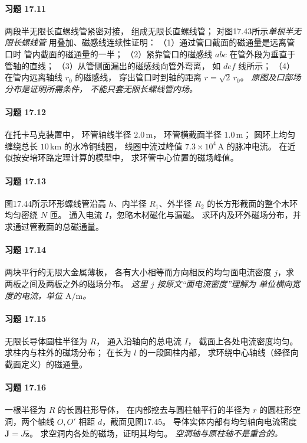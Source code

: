 \paragraph{习题 17.11}
两段半无限长直螺线管紧密对接，
组成无限长直螺线管；
对图17.43所示\emph{单根半无限长螺线管}
用叠加、磁感线连续性证明：
（1）通过管口截面的磁通量是远离管口时
管内截面的磁通量的一半；
（2）紧靠管口的磁感线
\(abc\) 在管外段为垂直于管轴的直线；
（3）从管侧面漏出的磁感线向管外弯离，
如 \(def\) 线所示；
（4）在管内远离轴线 \(r_0\) 的磁感线，
穿出管口时到轴的距离
\(r=\sqrt2\,r_0\)。
\textit{原图及口部场分布是证明所需条件，
不能只套无限长螺线管内场。}

\paragraph{习题 17.12}
在托卡马克装置中，
环管轴线半径
\(2.0\,\mathrm m\)，
环管横截面半径
\(1.0\,\mathrm m\)；
圆环上均匀缠绕总长
\(10\,\mathrm{km}\) 的水冷铜线圈，
线圈中流过峰值
\(7.3\times10^4\,\mathrm A\)
的脉冲电流。
在近似按安培环路定理计算的模型中，
求环管中心位置的磁场峰值。

\paragraph{习题 17.13}
图17.44所示环形螺线管沿高
\(h\)、内半径 \(R_1\)、外半径
\(R_2\) 的长方形截面的整个木环
均匀密绕 \(N\) 匝。
通入电流 \(I\)，忽略木材磁化与漏磁。
求环内及环外磁场分布，并求通过管截面的总磁通量。

\paragraph{习题 17.14}
两块平行的无限大金属薄板，
各有大小相等而方向相反的均匀面电流密度
\(j\)，求两板之间及两板之外的磁场分布。
\textit{这里 \(j\) 按原文“面电流密度”理解为
单位横向宽度的电流，单位 \(\mathrm{A/m}\)。}

\paragraph{习题 17.15}
无限长导体圆柱半径为 \(R\)，
通入沿轴向的总电流 \(I\)，
截面上各处电流密度均匀。
求柱内与柱外的磁场分布；
在长为 \(l\) 的一段圆柱内部，
求环绕中心轴线（经径向截面定义）的磁通量。

\paragraph{习题 17.16}
一根半径为 \(R\) 的长圆柱形导体，
在内部挖去与圆柱轴平行的半径为 \(r\)
的圆柱形空洞，两个轴线
\(O,O'\) 相距 \(d\)，截面见图17.45。
导体实体内部有均匀轴向电流密度
\(\boldsymbol J=J\hat{\boldsymbol z}\)。
求空洞内各处的磁场，证明其均匀。
\textit{空洞轴与原柱轴不是重合的。}


